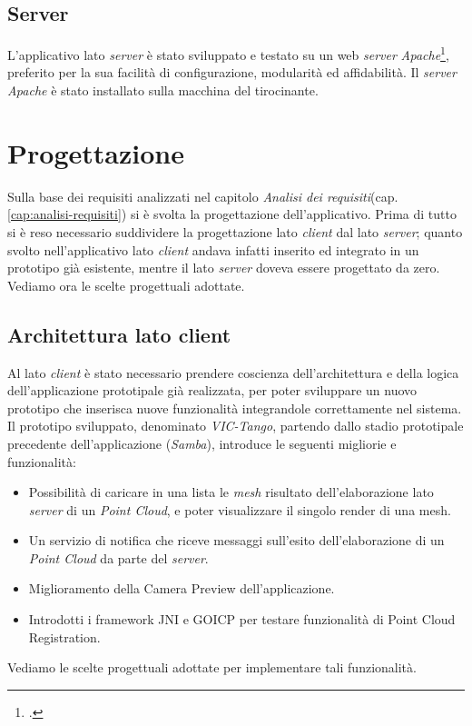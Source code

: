 \subsection{Server}
L'applicativo lato \emph{server} è stato sviluppato e testato su un web \emph{server} \emph{Apache}\footcite{https://httpd.apache.org/}, preferito per la sua facilità di configurazione, modularità ed affidabilità. Il \emph{server} \emph{Apache} è stato installato sulla macchina del tirocinante.

\section{Progettazione}
\label{sec:progettazione}
Sulla base dei requisiti analizzati nel capitolo \emph{Analisi dei requisiti}(cap. \ref{cap:analisi-requisiti}) si è svolta la progettazione dell'applicativo. Prima di tutto si è reso necessario suddividere la progettazione lato \emph{client} dal lato \emph{server}; quanto svolto nell'applicativo lato \emph{client} andava infatti inserito ed integrato in un prototipo già esistente, mentre il lato \emph{server} doveva essere progettato da zero.
Vediamo ora le scelte progettuali adottate.

\subsection{Architettura lato client}
Al lato \emph{client} è stato necessario prendere coscienza dell'architettura e della logica dell'applicazione prototipale già realizzata, per poter sviluppare un nuovo prototipo che inserisca nuove funzionalità integrandole correttamente nel sistema. 
Il prototipo sviluppato, denominato \emph{VIC-Tango}, partendo dallo stadio prototipale precedente dell'applicazione (\emph{Samba}), introduce le seguenti migliorie e funzionalità:
\begin{itemize}
\item Possibilità di caricare in una lista le \emph{mesh} risultato dell'elaborazione lato \emph{server} di un \emph{Point Cloud}, e poter visualizzare il singolo render di una mesh.
\item Un servizio di notifica che riceve messaggi sull'esito dell'elaborazione di un \emph{Point Cloud} da parte del \emph{server}.
\item Miglioramento della Camera Preview dell'applicazione.
\item Introdotti i framework JNI e GOICP per testare funzionalità di Point Cloud Registration.
\end{itemize}
Vediamo le scelte progettuali adottate per implementare tali funzionalità.

